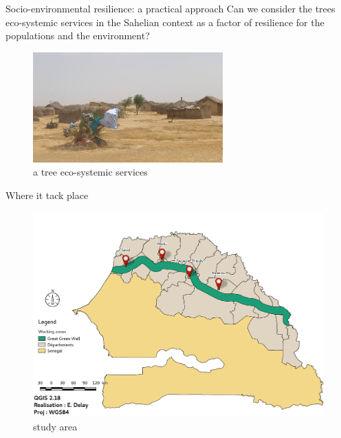 \documentclass[newPxFont]{beamer}
\begin{document}
\begin{frame}[c]{Socio-environmental resilience: a practical approach}
\vspace{-1cm}
Can we consider the trees eco-systemic services in the Sahelian context as a factor of resilience for the populations and the environment?


\begin{figure}
	\centering
	\includegraphics[width = 0.65\textwidth]{img/PA310152.JPG}
	\caption{a tree eco-systemic services}
\end{figure}
\end{frame}

\begin{frame}[c]{Where it tack place}
\vspace{-1cm}
\begin{figure}
	\centering
	\includegraphics[width = \textwidth]{img/localisation_map}
	\caption{study area}
\end{figure}
\end{frame}
\end{document}
